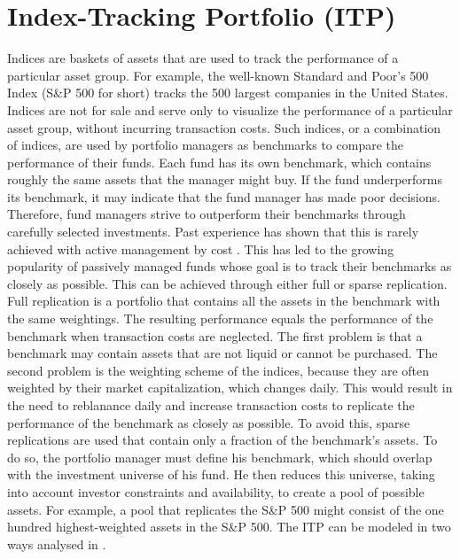 \documentclass[
  oneside, a4paper, 12pt, openany]{book}
\theoremstyle{definition}
\theoremstyle{definition}
\theoremstyle{definition}
\theoremstyle{definition}
\theoremstyle{remark}
\begin{document}
\hypertarget{index-tracking-portfolio-itp}{%
\section{Index-Tracking Portfolio (ITP)}\label{index-tracking-portfolio-itp}}

Indices are baskets of assets that are used to track the performance of a particular asset group. For example, the well-known Standard and Poor's 500 Index (S\&P 500 for short) tracks the 500 largest companies in the United States. Indices are not for sale and serve only to visualize the performance of a particular asset group, without incurring transaction costs. Such indices, or a combination of indices, are used by portfolio managers as benchmarks to compare the performance of their funds. Each fund has its own benchmark, which contains roughly the same assets that the manager might buy. If the fund underperforms its benchmark, it may indicate that the fund manager has made poor decisions. Therefore, fund managers strive to outperform their benchmarks through carefully selected investments. Past experience has shown that this is rarely achieved with active management by cost \citep{Desm2016}. This has led to the growing popularity of passively managed funds whose goal is to track their benchmarks as closely as possible. This can be achieved through either full or sparse replication. Full replication is a portfolio that contains all the assets in the benchmark with the same weightings. The resulting performance equals the performance of the benchmark when transaction costs are neglected. The first problem is that a benchmark may contain assets that are not liquid or cannot be purchased. The second problem is the weighting scheme of the indices, because they are often weighted by their market capitalization, which changes daily. This would result in the need to reblanance daily and increase transaction costs to replicate the performance of the benchmark as closely as possible. To avoid this, sparse replications are used that contain only a fraction of the benchmark's assets. To do so, the portfolio manager must define his benchmark, which should overlap with the investment universe of his fund. He then reduces this universe, taking into account investor constraints and availability, to create a pool of possible assets. For example, a pool that replicates the S\&P 500 might consist of the one hundred highest-weighted assets in the S\&P 500. The ITP can be modeled in two ways analysed in \citep{IuGa2019}.
\end{document}
